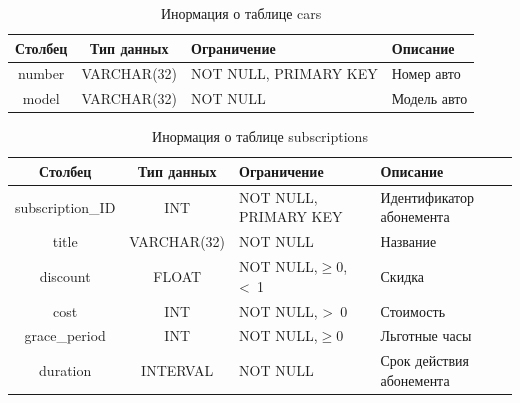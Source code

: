 \begin{table}[H]
	\begin{center}
		\begin{center}
			\caption{\label{tab:cars}Инормация о таблице cars}
		\end{center}
		\begin{tabular}{|c|c|p{3cm}|p{4cm}|}
			\hline 
			Столбец & Тип данных & Ограничение & Описание \\ \hline
			number & VARCHAR(32) & NOT NULL, PRIMARY KEY & Номер авто \\ \hline
	        model &  VARCHAR(32)  & NOT NULL & Модель авто  \\ \hline
		\end{tabular}
	\end{center}
\end{table}

\begin{table}[H]
	\begin{center}
		\begin{center}
			\caption{\label{tab:subs}Инормация о таблице subscriptions}
		\end{center}
		\begin{tabular}{|c|c|p{3cm}|p{4cm}|}
			\hline 
			Столбец & Тип данных & Ограничение & Описание \\ \hline
			subscription\_ID & INT & NOT NULL, PRIMARY KEY & Идентификатор
абонемента \\ \hline
	        title &  VARCHAR(32)  & NOT NULL & Название  \\ \hline
	        discount &  FLOAT & NOT NULL,\( \geq 0\), <~1 & Скидка  \\ \hline
	        cost & INT & NOT NULL, >~0 & Стоимость  \\ \hline
	        grace\_period & INT & NOT NULL,\( \geq 0\) & Льготные часы \\ \hline
	        duration & INTERVAL & NOT NULL & Срок действия абонемента \\ \hline
		\end{tabular}						 
	\end{center}
\end{table}

